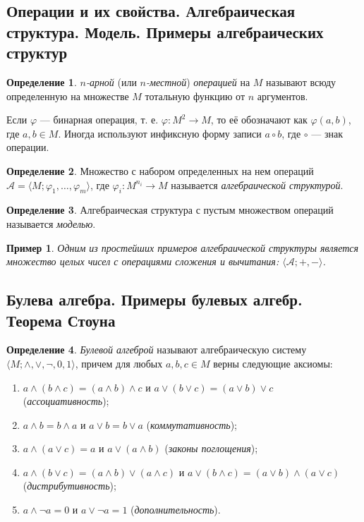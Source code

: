 \documentclass{article}
\theoremstyle{plain}
\newtheorem*{example*}{Пример}
\theoremstyle{definition}
\newtheorem{definition}{Определение}[subsection]
\begin{document}
\subsection{Операции и их свойства. Алгебраическая структура. Модель. Примеры алгебраических структур}

\begin{definition}
	\textit{\(n\)-арной} (или \textit{\(n\)-местной}) \textit{операцией} на \(M\) называют всюду определенную на множестве \(M\) тотальную функцию от \(n\) аргументов.
\end{definition}

Если \(\varphi\) --- бинарная операция, т. е. \(\varphi \colon M^2 \rightarrow M\), то её обозначают как \(\varphi(a, b)\), где \(a, b \in M\). Иногда используют инфиксную форму записи \(a \circ b\), где \(\circ\) --- знак операции.

\begin{definition}
	Множество с набором определенных на нем операций \(\mathcal{A} = \langle M; \varphi_1, \ldots, \varphi_m \rangle\), где \(\varphi_i \colon M^{n_i} \rightarrow M\) называется \textit{алгебраической структурой}.
\end{definition}

\begin{definition}
	Алгебраическая структура с пустым множеством операций называется \textit{моделью}.
\end{definition}

\begin{example*}
	Одним из простейших примеров алгебраической структуры является множество целых чисел с операциями сложения и вычитания: \(\langle \mathcal{A}; +, -\rangle\).
\end{example*}

\subsection{Булева алгебра. Примеры булевых алгебр. Теорема Стоуна}

\begin{definition}
	\textit{Булевой алгеброй} называют алгебраическую систему \(\langle M; \land, \lor, \lnot, 0, 1\rangle\), причем для любых \(a, b, c \in M\) верны следующие аксиомы:

	\begin{enumerate}[label=\roman*.]
		\item \(a \land (b \land c) = (a \land b) \land c\) и \(a \lor (b \lor c) = (a \lor b) \lor c\) (\textit{ассоциативность});
		\item \(a \land b = b \land a\) и \(a \lor b = b \lor a\) (\textit{коммутативность});
		\item \(a \land (a \lor c) = a\) и \(a \lor (a \land b)\) (\textit{законы поглощения});
		\item \(a \land (b \lor c) = (a \land b) \lor (a \land c)\) и \(a \lor (b \land c) = (a \lor b) \land (a \lor c)\) (\textit{дистрибутивность});
		\item \(a \land \lnot a = 0\) и \(a \lor \lnot a = 1\) (\textit{дополнительность}).
	\end{enumerate}
\end{definition}
\end{document}
